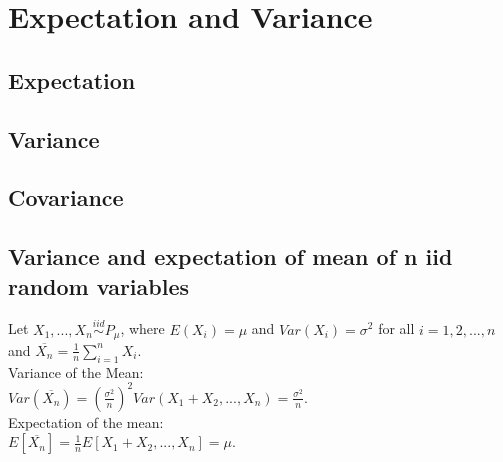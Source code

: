 \section{Expectation and Variance}
\subsection*{Expectation}
\subsection*{Variance}
\subsection*{Covariance}
\subsection*{Variance and expectation of mean of n iid random variables}
Let $X_1, ..., X_n \stackrel{iid}{\sim} P_{\mu}$, where $E(X_i)=\mu$ and $Var(X_i)=\sigma^2$ for all $i=1,2,...,n$ and $\overline{X_n}= \frac{1}{n} \sum_{i=1}^{n} X_i$.\\

Variance of the Mean:\\

$Var(\overline{X_n})=(\frac{\sigma^2}{n})^2 Var(X_1 + X_2,...,X_n) =  \frac{\sigma^2}{n}$.\\

Expectation of the mean:\\

$E[\overline{X_n}]=\frac{1}{n}E[X_1 + X_2,...,X_n] = \mu$.